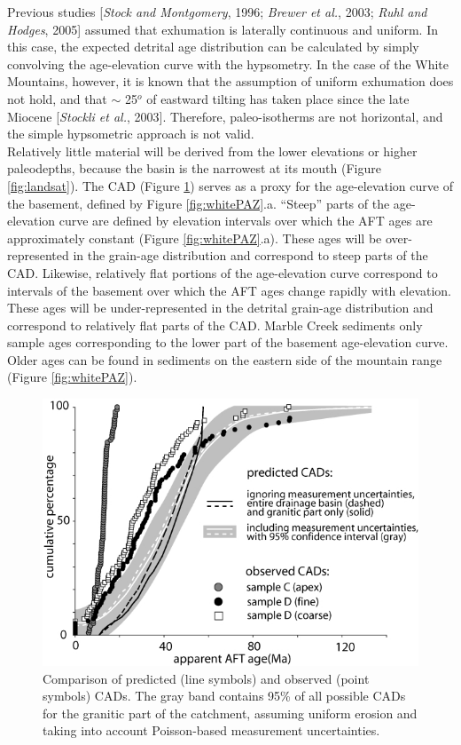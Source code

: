 \documentclass[12pt,twoside]{article}
\begin{document}
Previous  studies [{\it Stock  and Montgomery},  1996; {\it  Brewer et
  al.}, 2003; {\it Ruhl and  Hodges}, 2005] assumed that exhumation is
laterally continuous and uniform.  In this case, the expected detrital
age  distribution   can  be   calculated  by  simply   convolving  the
age-elevation curve  with the  hypsometry.  In the  case of  the White
Mountains,  however,  it  is  known  that the  assumption  of  uniform
exhumation does not  hold, and that $\sim$ 25$^o$  of eastward tilting
has taken place  since the late Miocene [{\it Stockli  et al.}, 2003]. 
Therefore,  paleo-isotherms   are  not  horizontal,   and  the  simple
hypsometric approach is not valid.
\\

Relatively little  material will be derived from  the lower elevations
or higher paleodepths, because the basin is the narrowest at its mouth
(Figure \ref{fig:landsat}).  The CAD (Figure \ref{fig:obsCADs}) serves
as a  proxy for  the age-elevation curve  of the basement,  defined by
Figure  \ref{fig:whitePAZ}.a.  ``Steep''  parts  of the  age-elevation
curve are defined  by elevation intervals over which  the AFT ages are
approximately constant (Figure \ref{fig:whitePAZ}.a).  These ages will
be over-represented  in the  grain-age distribution and  correspond to
steep parts  of the  CAD.  Likewise, relatively  flat portions  of the
age-elevation curve correspond to intervals of the basement over which
the  AFT ages  change  rapidly  with elevation.   These  ages will  be
under-represented   in  the   detrital   grain-age  distribution   and
correspond  to  relatively  flat  parts  of  the  CAD.   Marble  Creek
sediments  only sample  ages corresponding  to the  lower part  of the
basement age-elevation curve.  Older ages can be found in sediments on
the eastern side of the mountain range (Figure \ref{fig:whitePAZ}).
\\

\begin{figure}[here]
  \centering
  \includegraphics[width=.667\textwidth]{fig6.jpg}
  \caption[Observed CADs]
  {Comparison of predicted (line symbols) and observed (point symbols)
    CADs.  The  gray band contains 95\%  of all possible  CADs for the
    granitic  part  of the  catchment,  assuming  uniform erosion  and
    taking into account Poisson-based measurement uncertainties.}
\label{fig:obsCADs}
\end{figure}
\end{document}
